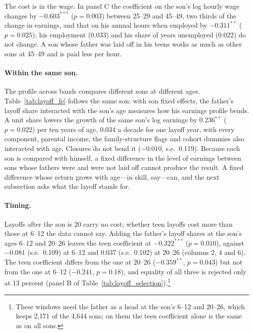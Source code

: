 The cost is in the wage. In panel C the coefficient on the son's log hourly wage changes by $-0.603^{***}$ ($p = 0.003$)
between 25--29 and 45--49, two thirds of the change in earnings, and that on his annual hours when employed by
$-0.311^{**}$ ($p = 0.025$); his employment ($0.033$) and his share of years unemployed ($0.022$) do not change. A son
whose father was laid off in his teens works as much as other sons at 45--49 and is paid less per hour.

\paragraph{Within the same son.} The profile across bands compares different sons at different ages. Table~\ref{tab:layoff_fe}
follows the same son: with son fixed effects, the father's layoff share interacted with the son's age measures how his
earnings profile bends. A unit share lowers the growth of the same son's log earnings by 0.236$^{**}$ ($p = 0.022$) per
ten years of age, 0.034 a decade for one layoff year, with every component, parental income, the family-structure flags
and cohort dummies also interacted with age. Closures do not bend it ($-0.010$, s.e.\ 0.119). Because each son is
compared with himself, a fixed difference in the level of earnings between sons whose fathers were and were not laid
off cannot produce the result. A fixed difference whose return grows with age---in skill, say---can, and the next
subsection asks what the layoff stands for.

\paragraph{Timing.} Layoffs after the son is 20 carry no cost; whether teen layoffs cost more than those at 6--12 the data
cannot say. Adding the father's layoff shares at the son's ages 6--12 and 20--26 leaves the teen coefficient at
$-0.322^{***}$ ($p = 0.010$), against $-0.081$ (s.e.\ 0.109) at 6--12 and 0.037 (s.e.\ 0.102) at 20--26 (columns 2, 4
and 6). The teen coefficient differs from the one at 20--26 ($-0.359^{**}$, $p = 0.043$) but not from the one at 6--12
($-0.241$, $p = 0.18$), and equality of all three is rejected only at 13 percent (panel B of
Table~\ref{tab:layoff_selection}).\footnote{These windows need the father as a head at the son's 6--12 and 20--26,
which keeps 2,171 of the 4,644 sons; on them the teen coefficient alone is the same as on all sons.}



